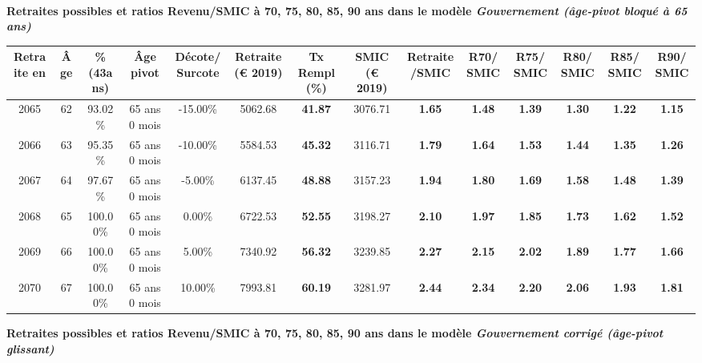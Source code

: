  ~\\{\bf \noindent Retraites possibles et ratios Revenu/SMIC à 70, 75, 80, 85, 90 ans dans le modèle \emph{Gouvernement (âge-pivot bloqué à 65 ans)}}  
 
\begin{adjustbox}{max width=\textwidth} 
\begin{tabular}[htb]{|c|c||c|c|c||c|c||c|c||c|c|c|c|c|} 
\hline 
 Retraite en &  Âge &  \%(43ans) &  Âge pivot &  Décote/Surcote &  Retraite (\euro{} 2019) &  Tx Rempl(\%) &  SMIC (\euro{} 2019) &  Retraite/SMIC &  R70/SMIC &  R75/SMIC &  R80/SMIC &  R85/SMIC &  R90/SMIC \\ 
\hline \hline 
 2065 &  62 &  93.02\% &  65 ans 0 mois &  -15.00\% &  5062.68 &  {\bf 41.87} &  3076.71 &  {\bf 1.65} &  {\bf 1.48} &  {\bf 1.39} &  {\bf 1.30} &  {\bf 1.22} &  {\bf 1.15} \\ 
\hline 
 2066 &  63 &  95.35\% &  65 ans 0 mois &  -10.00\% &  5584.53 &  {\bf 45.32} &  3116.71 &  {\bf 1.79} &  {\bf 1.64} &  {\bf 1.53} &  {\bf 1.44} &  {\bf 1.35} &  {\bf 1.26} \\ 
\hline 
 2067 &  64 &  97.67\% &  65 ans 0 mois &  -5.00\% &  6137.45 &  {\bf 48.88} &  3157.23 &  {\bf 1.94} &  {\bf 1.80} &  {\bf 1.69} &  {\bf 1.58} &  {\bf 1.48} &  {\bf 1.39} \\ 
\hline 
 2068 &  65 &  100.00\% &  65 ans 0 mois &  0.00\% &  6722.53 &  {\bf 52.55} &  3198.27 &  {\bf 2.10} &  {\bf 1.97} &  {\bf 1.85} &  {\bf 1.73} &  {\bf 1.62} &  {\bf 1.52} \\ 
\hline 
 2069 &  66 &  100.00\% &  65 ans 0 mois &  5.00\% &  7340.92 &  {\bf 56.32} &  3239.85 &  {\bf 2.27} &  {\bf 2.15} &  {\bf 2.02} &  {\bf 1.89} &  {\bf 1.77} &  {\bf 1.66} \\ 
\hline 
 2070 &  67 &  100.00\% &  65 ans 0 mois &  10.00\% &  7993.81 &  {\bf 60.19} &  3281.97 &  {\bf 2.44} &  {\bf 2.34} &  {\bf 2.20} &  {\bf 2.06} &  {\bf 1.93} &  {\bf 1.81} \\ 
\hline 
\hline 
\end{tabular} 
\end{adjustbox} 
 
 \vspace{0.1cm} 
{\bf \noindent Retraites possibles et ratios Revenu/SMIC à 70, 75, 80, 85, 90 ans dans le modèle \emph{Gouvernement corrigé (âge-pivot glissant)}}  
 
